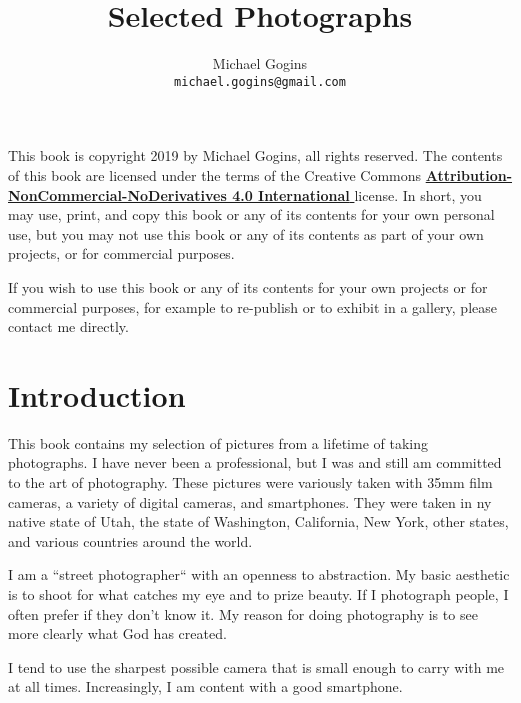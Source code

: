 \documentclass[11pt,chapterprefix=true,pagesize=letter]{scrbook}
\begin{document}
\frontmatter
\title{Selected Photographs}
\author{Michael Gogins \\ \texttt{michael.gogins@gmail.com}}
\dedication{This book is for Mick.}
\newpage
\noindent This book is copyright 2019 by Michael Gogins, all rights reserved. The contents of this book are licensed under the terms of the Creative Commons \href{https://creativecommons.org/licenses/by-nc-nd/4.0/legalcode}{\textbf{Attribution-NonCommercial-NoDerivatives 4.0 International} } license. In short, you may use, print, and copy this book or any of its contents for your own personal use, but you may not use this book or any of its contents as part of your own projects, or for commercial purposes.

If you wish to use this book or any of its contents for your own projects or for commercial purposes, for example to re-publish or to exhibit in a gallery, please contact me directly.
\maketitle

\tableofcontents
\listoffigures

\mainmatter
{}

\chapter{Introduction}

This book contains my selection of pictures from a lifetime of taking photographs. I have never been a professional, but I was and still am committed to the art of photography. These pictures were variously taken with 35mm film cameras, a variety of digital cameras, and smartphones. They were taken in ny native state of Utah, the state of Washington, California, New York, other states, and various countries around the world. 

I am a ``street photographer`` with an openness to abstraction. My basic aesthetic is to shoot for what catches my eye and to prize beauty. If I photograph people, I often prefer if they don't know it. My reason for doing photography is to see more clearly what God has created.

I tend to use the sharpest possible camera that is small enough to carry with me at all times. Increasingly, I am content with a good smartphone.
\end{document}
